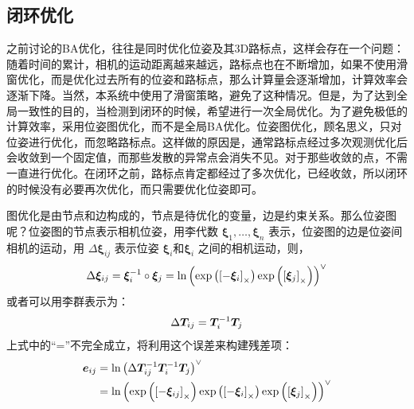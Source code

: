 \subsection{闭环优化}
之前讨论的BA优化，往往是同时优化位姿及其3D路标点，这样会存在一个问题：随着时间的累计，相机的运动距离越来越远，路标点也在不断增加，如果不使用滑窗优化，而是优化过去所有的位姿和路标点，那么计算量会逐渐增加，计算效率会逐渐下降。当然，本系统中使用了滑窗策略，避免了这种情况。但是，为了达到全局一致性的目的，当检测到闭环的时候，希望进行一次全局优化。为了避免极低的计算效率，采用位姿图优化，而不是全局BA优化。位姿图优化，顾名思义，只对位姿进行优化，而忽略路标点。这样做的原因是，通常路标点经过多次观测优化后会收敛到一个固定值，而那些发散的异常点会消失不见。对于那些收敛的点，不需一直进行优化。在闭环之前，路标点肯定都经过了多次优化，已经收敛，所以闭环的时候没有必要再次优化，而只需要优化位姿即可。

图优化是由节点和边构成的，节点是待优化的变量，边是约束关系。那么位姿图呢？位姿图的节点表示相机位姿，用李代数 $ \bm{ \xi}_{1}, {\ldots}, \bm{\xi}_{n} $ 表示，位姿图的边是位姿间相机的运动，用 $\Delta \boldsymbol{\xi}_{i j} $ 表示位姿 $\bm{\xi}_{i} $和$\bm{\xi}_{i} $ 之间的相机运动，则，
\begin{equation}
\label{eqn:4.35}
\setlength{\abovedisplayskip}{6pt}
\setlength{\belowdisplayskip}{6pt}
\Delta \boldsymbol{\xi}_{i j}=\boldsymbol{\xi}_{i}^{-1} \circ \boldsymbol{\xi}_{j}=\ln \left(\exp \left(\left[-\boldsymbol{\xi}_{i}\right]_\times \right) \exp \left(\left[\boldsymbol{\xi}_{j}\right]_\times\right)\right)^{\vee}
\end{equation}
或者可以用李群表示为：
\begin{equation}
\label{eqn:4.36}
\setlength{\abovedisplayskip}{6pt}
\setlength{\belowdisplayskip}{6pt}
\Delta \boldsymbol{T}_{i j}=\boldsymbol{T}_{i}^{-1} \boldsymbol{T}_{j}
\end{equation}
上式中的“=”不完全成立，将利用这个误差来构建残差项：
\begin{equation}
\label{eqn:4.37}
\setlength{\abovedisplayskip}{6pt}
\setlength{\belowdisplayskip}{6pt}
\begin{aligned} 
	\boldsymbol{e}_{i j} &=\ln \left(\Delta \boldsymbol{T}_{i j}^{-1} \boldsymbol{T}_{i}^{-1} \boldsymbol{T}_{j}\right)^{\vee} \\ 
	&=\ln \left( \exp \left(\left[-\boldsymbol{\xi}_{i j}\right]_\times \right) \exp \left(\left[-\boldsymbol{\xi}_{i}\right]_\times\right) \exp \left( \left[\boldsymbol{\xi}_{j}\right]_\times \right)\right)^{\vee} 
\end{aligned}
\end{equation}

